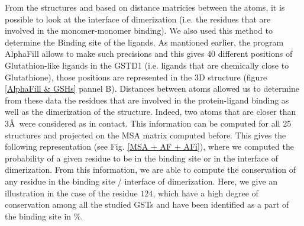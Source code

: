 \noindent From the structures and based on distance matricies between the atoms, it is possible to look at the interface of dimerization (i.e. the residues that are involved in the monomer-monomer binding). We also used this method to determine the Binding site of the ligands. As mantioned earlier, the program AlphaFill allows to make such precisions and this gives $40$ different positions of Glutathion-like ligands in the GSTD1 (i.e. ligands that are chemically close to Glutathione), those positions are represented in the 3D structure (figure \ref{AlphaFill & GSHs} pannel B). Distances between atoms allowed us to determine from these data the residues that are involved in the protein-ligand binding as well as the dimerization of the structure. Indeed, two atoms that are closer than $3$\AA ~were considered as in contact. This information can be computed for all 25 structures and projected on the MSA matrix computed before. This gives the following representation (see Fig. \ref{MSA + AF + AFi}), where we computed the probability of a given residue to be in the binding site or in the interface of dimerization. From this information, we are able to compute the conservation of any residue in the binding site / interface of dimerization. Here, we give an illustration in the case of the residue $124$, which have a high degree of conservation among all the studied GSTs and have been identified as a part of the binding site in $\%$.

